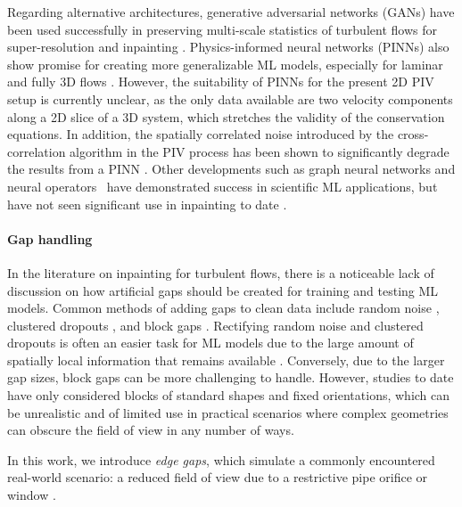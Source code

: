 \documentclass{article}
\begin{document}
Regarding alternative architectures, generative adversarial networks (GANs) have been used successfully in preserving multi-scale statistics of turbulent flows for super-resolution \cite{guemes2022super,kim2021unsupervised} and inpainting \cite{li2023multi}. Physics-informed neural networks (PINNs) \cite{raissi2019physics} also show promise for creating more generalizable ML models, especially for laminar and fully 3D flows \cite{krishnapriyan2021characterizing,eivazi2022physics,wang2020towards}.
However, the suitability of PINNs for the present 2D PIV setup is currently unclear, as the only data available are two velocity components along a 2D slice of a 3D system, which stretches the validity of the conservation equations. In addition, the spatially correlated noise introduced by the cross-correlation algorithm in the PIV process has been shown to significantly degrade the results from a PINN \cite{wang2022dense}. Other developments such as graph neural networks \cite{kipf2016semi,pfaff2020learning,gao2019graph} and neural operators~\cite{lu2019deeponet,kovachki2023neural,li2020fourier} have demonstrated success in scientific ML applications, but have not seen significant use in inpainting to date \cite{elharrouss2020image,jam2021comprehensive}. 

\paragraph{Gap handling}
In the literature on inpainting for turbulent flows, there is a noticeable lack of discussion on how artificial gaps should be created for training and testing ML models. Common methods of adding gaps to clean data include random noise \cite{venturi2004gappy,wang2015proper}, clustered dropouts \cite{raben2012adaptive,saini2016development}, and block gaps \cite{nekkanti2023gappy,zhang2023improved,luo2023reconstruction}. Rectifying random noise and clustered dropouts is often an easier task for ML models due to the large amount of spatially local information that remains available \cite{buzzicotti2021reconstruction}. Conversely, due to the larger gap sizes, block gaps can be more challenging to handle. However, studies to date have only considered blocks of standard shapes and fixed orientations, which can be unrealistic and of limited use in practical scenarios where complex geometries can obscure the field of view in any number of ways. 

In this work, we introduce \textit{edge gaps}, which simulate a commonly encountered real-world scenario: a reduced field of view due to a restrictive pipe orifice or window \cite{rabault2016study,zha2015characterization}. 
\end{document}
